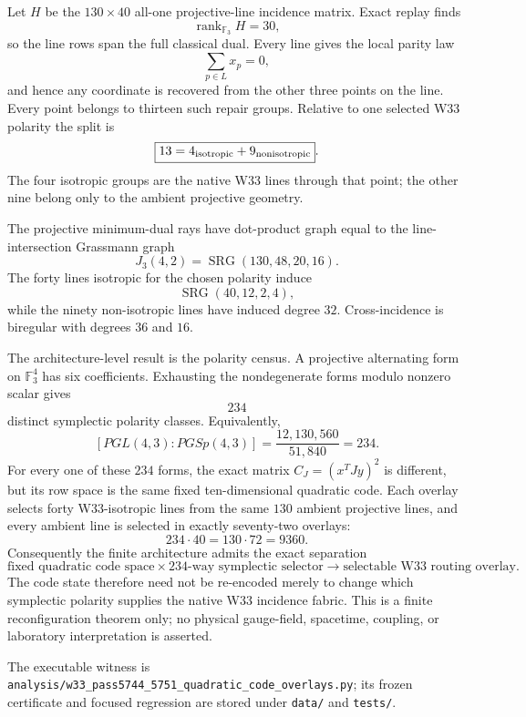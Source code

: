Let $H$ be the $130\times40$ all-one projective-line incidence matrix.  Exact replay
finds
\[
\operatorname{rank}_{\mathbb F_3}H=30,
\]
so the line rows span the full classical dual.  Every line gives the local parity law
\[
\sum_{p\in L}x_p=0,
\]
and hence any coordinate is recovered from the other three points on the line.
Every point belongs to thirteen such repair groups.  Relative to one selected W33
polarity the split is
\[
\boxed{13=4_{\rm isotropic}+9_{\rm nonisotropic}}.
\]
The four isotropic groups are the native W33 lines through that point; the other nine
belong only to the ambient projective geometry.

The projective minimum-dual rays have dot-product graph equal to the line-intersection
Grassmann graph
\[
\boxed{J_3(4,2)=\operatorname{SRG}(130,48,20,16)}.
\]
The forty lines isotropic for the chosen polarity induce
\[
\boxed{\operatorname{SRG}(40,12,2,4)},
\]
while the ninety non-isotropic lines have induced degree $32$.  Cross-incidence is
biregular with degrees $36$ and $16$.

The architecture-level result is the polarity census.  A projective alternating form
on $\mathbb F_3^4$ has six coefficients.  Exhausting the nondegenerate forms modulo
nonzero scalar gives
\[
\boxed{234}
\]
distinct symplectic polarity classes.  Equivalently,
\[
[PGL(4,3):PGSp(4,3)]
=\frac{12{,}130{,}560}{51{,}840}=234.
\]
For every one of these $234$ forms, the exact matrix $C_J=(x^TJy)^2$ is different,
but its row space is the same fixed ten-dimensional quadratic code.  Each overlay
selects forty W33-isotropic lines from the same $130$ ambient projective lines, and
every ambient line is selected in exactly seventy-two overlays:
\[
234\cdot40=130\cdot72=9360.
\]
Consequently the finite architecture admits the exact separation
\[
\boxed{
\text{fixed quadratic code space}
\times
\text{234-way symplectic selector}
\longrightarrow
\text{selectable W33 routing overlay}.
}
\]
The code state therefore need not be re-encoded merely to change which symplectic
polarity supplies the native W33 incidence fabric.  This is a finite reconfiguration
theorem only; no physical gauge-field, spacetime, coupling, or laboratory interpretation
is asserted.

The executable witness is
\texttt{analysis/w33\_pass5744\_5751\_quadratic\_code\_overlays.py}; its frozen
certificate and focused regression are stored under \texttt{data/} and \texttt{tests/}.
